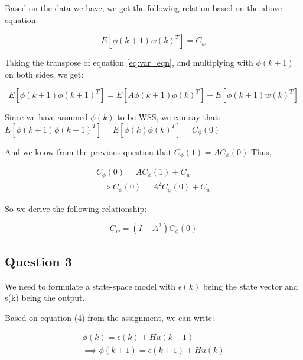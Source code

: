 \documentclass[12pt]{report}
\begin{document}
Based on the data we have, we get the following relation based on the above equation:

\begin{equation*}
	E\left[\phi(k+1)w(k)^{T}\right] = C_{w}
\end{equation*}

Taking the transpose of equation \ref{eq:var_eqn}, and multiplying with $\phi(k+1)$ on both sides, we get: 

\begin{equation*}
E\left[\phi(k+1)\phi(k+1)^{T}\right] = E\left[A\phi(k+1)\phi(k)^{T}\right] + E\left[\phi(k+1)w(k)^{T}\right]
\end{equation*} 

Since we have assumed $\phi(k)$ to be WSS, we can say that:\newline
$E\left[\phi(k+1)\phi(k+1)^{T}\right] = E\left[\phi(k)\phi(k)^{T}\right] = C_{\phi}(0)$ 

And we know from the previous question that $C_{\phi}(1) = AC_{\phi}(0)$\newline
Thus,

\begin{equation*}
\begin{aligned}
C_{\phi}(0) = AC_{\phi}(1) + C_{w}\\
\implies C_{\phi}(0) = A^2C_{\phi}(0) + C_{w}
\end{aligned}
\end{equation*}

So we derive the following relationship:

\begin{equation*}
C_{w} = (I-A^2)C_{\phi}(0)
\end{equation*} 

\subsection*{Question 3}

We need to formulate a state-space model with $\epsilon(k)$ being the state vector and s(k) being the output.

Based on equation (4) from the assignment, we can write:

\begin{equation*}
\begin{aligned}
\phi(k) = \epsilon(k) + Hu(k-1)\\
\implies \phi(k+1) = \epsilon(k+1) + Hu(k)
\end{aligned}
\end{equation*} 
\end{document}
